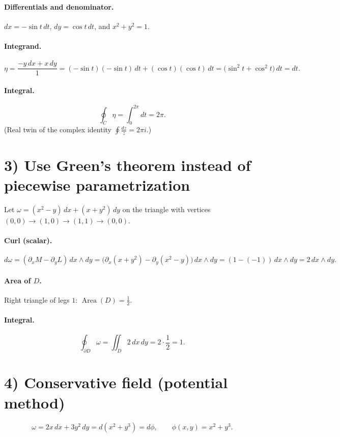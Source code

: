 \documentclass[11pt]{article}
\begin{document}
\paragraph{Differentials and denominator.}
$dx=-\sin t\,dt$, $dy=\cos t\,dt$, and $x^{2}+y^{2}=1$.

\paragraph{Integrand.}
\[
\eta
=
\frac{-y\,dx+x\,dy}{1}
=
(-\sin t)(-\sin t)\,dt+(\cos t)(\cos t)\,dt
=
\bigl(\sin^{2}t+\cos^{2}t\bigr)\,dt
=
dt.
\]

\paragraph{Integral.}
\[
\oint_{C}\eta=\int_{0}^{2\pi}dt=2\pi.
\]
(Real twin of the complex identity $\displaystyle \oint \frac{dz}{z}=2\pi i$.)

\bigskip

\section*{3) Use Green's theorem instead of piecewise parametrization}
Let $\omega=(x^{2}-y)\,dx+(x+y^{2})\,dy$ on the triangle with vertices $(0,0)\to(1,0)\to(1,1)\to(0,0)$.

\paragraph{Curl (scalar).}
\[
d\omega=(\partial_x M-\partial_y L)\,dx\wedge dy
=
\bigl(\partial_x(x+y^{2})-\partial_y(x^{2}-y)\bigr)\,dx\wedge dy
=
(1-(-1))\,dx\wedge dy
=
2\,dx\wedge dy.
\]

\paragraph{Area of $D$.}
Right triangle of legs $1$: $\operatorname{Area}(D)=\tfrac12$.

\paragraph{Integral.}
\[
\oint_{\partial D}\omega
=
\iint_{D} 2\,dx\,dy
=
2\cdot \frac12
=
1.
\]

\bigskip

\section*{4) Conservative field (potential method)}
\[
\omega=2x\,dx+3y^{2}\,dy=d(x^{2}+y^{3})=d\phi,\qquad \phi(x,y)=x^{2}+y^{3}.
\]
\end{document}
